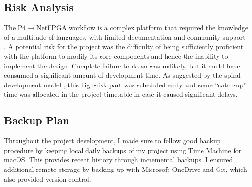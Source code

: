 \subsection{Risk Analysis}
The P4$\rightarrow$NetFPGA workflow is a complex platform that required the knowledge of a multitude of languages, with limited documentation \cite{fpga} and community support \cite{support}. A potential risk for the project was the difficulty of being sufficiently proficient with the platform to modify its core components and hence the inability to implement the design. Complete failure to do so was unlikely, but it could have consumed a significant amount of development time. As suggested by the spiral development model \cite{spiral}, this high-risk part was scheduled early and some “catch-up” time was allocated in the project timetable in case it caused significant delays.

\subsection{Backup Plan}	
Throughout the project development, I made sure to follow good backup procedure by keeping local daily backups of my project using Time Machine for macOS. This provides recent history through incremental backups. I ensured additional remote storage by backing up with Microsoft OneDrive and Git, which also provided version control.